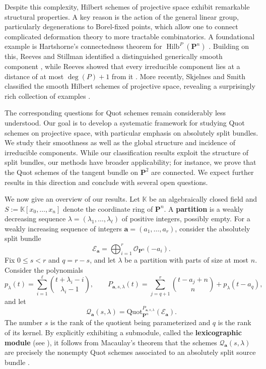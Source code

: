 \documentclass[leqno,11pt,a4paper]{amsart}
\theoremstyle{definition}
\numberwithin{equation}{section}
\newcommand{\kk}{\mathbb{K}}
\newcommand{\bfa}{\mathbf{a}}
\newcommand{\Quot}{\mathrm{Quot}}
\newcommand{\PP}{\mathbf{P}}
\newcommand{\EE}{\mathscr{E}}
\newcommand{\OO}{\mathscr{O}}
\newcommand{\QQ}{\mathcal{Q}}
\DeclareMathOperator{\Hilb}{Hilb}
\begin{document}
Despite this complexity, Hilbert schemes of projective space exhibit remarkable structural properties. 
A key reason is the action of the general linear group, particularly degenerations to Borel-fixed points, which allow one to connect complicated deformation theory to more tractable combinatorics.
A foundational example is Hartshorne's connectedness theorem for $\Hilb^P(\PP^n)$ \cite{har66connectedness}. 
Building on this, Reeves and Stillman identified a distinguished generically smooth component \cite{RS97}, while Reeves showed that every irreducible component lies at a distance of at most $\deg(P)+1$ from it \cite{Reeves_radius}. 
More recently, Skjelnes and Smith classified the smooth Hilbert schemes of projective space, revealing a surprisingly rich collection of examples \cite{Staal_smooth_hilbert_schemes,SS23}.


The corresponding questions for Quot schemes remain considerably less understood. 
Our goal is to develop a systematic framework for studying Quot schemes on projective space, with particular emphasis on absolutely split bundles. 
We study their smoothness as well as the global structure and incidence of irreducible components. 
While our classification results exploit the structure of split bundles, our methods have broader applicability; for instance, we prove that the Quot schemes of the tangent bundle on $\PP^2$ are connected. 
We expect further results in this direction and conclude with several open questions.

We now give an overview of our results.
Let $\kk$ be an algebraically closed field and $S := \kk[x_0,\dots,x_n]$ denote the coordinate ring of $\PP^n$. 
A \textbf{partition} is a weakly decreasing sequence $\lambda=(\lambda_1,\ldots,\lambda_{\ell})$ of positive integers, possibly empty.
For a weakly increasing sequence of integers $\bfa=(a_1,\ldots,a_r)$, consider the absolutely split bundle
$$
\EE_{\bfa}=\bigoplus_{i=1}^r\OO_{\PP^n}(-a_i).
$$
Fix $0\leq s<r$ and $q=r-s$, and let $\lambda$ be a partition with parts of size at most $n$. 
Consider the polynomials
$$
p_\lambda(t)=\sum_{i=1}^{\ell} \binom{t+\lambda_i-i}{\lambda_i-1},
\qquad
P_{\bfa,s,\lambda}(t) = \sum_{j=q+1}^r\binom{t-a_j+n}{n}+p_\lambda(t-a_q),
$$
and let
$$
\QQ_{\bfa}(s,\lambda) = \Quot^{P_{\bfa,s,\lambda}}_{\PP^n}(\EE_{\bfa}).
$$
The number $s$ is the rank of the quotient being parameterized and $q$ is the rank of its kernel.
By explicitly exhibiting a submodule, called the \textbf{lexicographic module} (see ), it follows from Macaulay's theorem that the schemes $\QQ_{\bfa}(s,\lambda)$ are precisely the nonempty Quot schemes associated to an absolutely split source bundle \cite{Hulett95, Pardue} .
\end{document}
